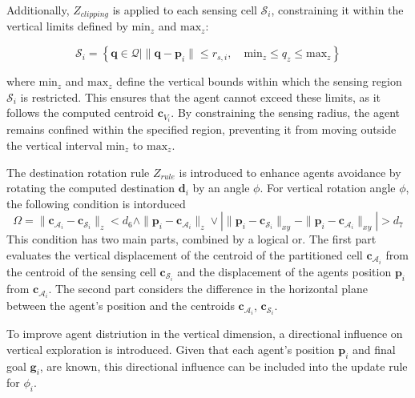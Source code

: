        Additionally, $Z_{clipping}$ is applied to each sensing cell $\mathcal{S}_i$, constraining it within the vertical limits defined by $\text{min}_z$ and $\text{max}_z$:

        \begin{equation}
            \mathcal{S}_i = \left\{\mathbf{q} \in \mathcal{Q} \mid \|\mathbf{q} - \mathbf{p}_i\| \leq r_{s,i}, \quad \text{min}_z \leq q_z \leq \text{max}_z \right\}
        \end{equation}

        where $\text{min}_z$ and $\text{max}_z$ define the vertical bounds within which the sensing region $\mathcal{S}_i$ is restricted. 
        This ensures that the agent cannot exceed these limits, as it follows the computed centroid \( \mathbf{c}_{V_i} \). 
        By constraining the sensing radius, the agent remains confined within the specified region, preventing it from moving outside the vertical interval $\text{min}_z$ to $\text{max}_z$.

        The destination rotation rule $Z_{rule}$ is introduced to enhance agents avoidance by rotating the computed destination $\mathbf{d}_i$ by an angle $\phi$.
        For vertical rotation angle $\phi$, the following condition is intorduced
        \begin{equation}
            \label{eqn:phi_condition}
            \Omega = \|\mathbf{c}_{\mathcal{A}_i} - \mathbf{c}_{\mathcal{S}_i}\|_z < d_6 \land \|\mathbf{p}_i - \mathbf{c}_{\mathcal{A}_i}\|_z \lor 
            | \|\mathbf{p}_i - \mathbf{c}_{\mathcal{S}_i}\|_{xy} - \|\mathbf{p}_i - \mathbf{c}_{\mathcal{A}_i}\|_{xy} | > d_7
        \end{equation}
        This condition has two main parts, combined by a logical or. The first part evaluates the vertical displacement of the centroid of the partitioned cell $\mathbf{c}_{\mathcal{A}_i}$ from the centroid of the sensing cell $\mathbf{c}_{\mathcal{S}_i}$ and the
        displacement of the agents position $\mathbf{p}_i$ from  $\mathbf{c}_{\mathcal{A}_i}$.
        The second part considers the difference in the horizontal plane between the agent's position and the centroids $\mathbf{c}_{\mathcal{A}_i}$, $\mathbf{c}_{\mathcal{S}_i}$.

        To improve agent distriution in the vertical dimension, a directional influence on vertical exploration is introduced. 
        Given that each agent's position $\mathbf{p}_i$ and final goal $\mathbf{g}_i$, are known, this directional influence can be included into the update rule for $\phi_i$.

